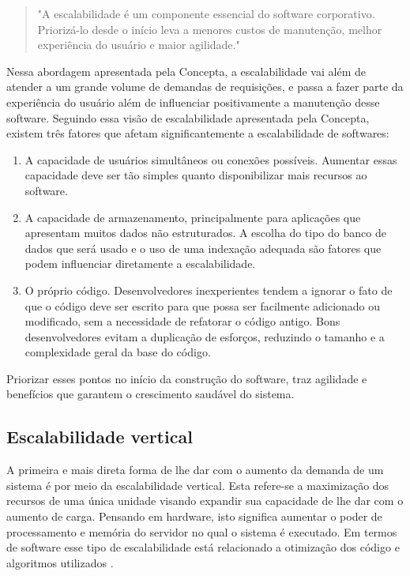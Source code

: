   \begin{quotation}
    "A escalabilidade é um componente essencial do software corporativo. Priorizá-lo
    desde o início leva a menores custos de manutenção, melhor experiência do usuário
    e maior agilidade."
  \end{quotation}

Nessa abordagem apresentada pela Concepta, a escalabilidade vai além de atender
a um grande volume de demandas de requisições, e passa a fazer parte da
experiência do usuário além de influenciar positivamente a manutenção desse
software. Seguindo essa visão de escalabilidade apresentada pela Concepta,
existem três fatores que afetam significantemente a escalabilidade de softwares:

  \begin{enumerate}
    \item A capacidade de usuários simultâneos ou conexões possíveis.
    Aumentar essas capacidade deve ser tão simples quanto disponibilizar mais
    recursos ao software.
    \item A capacidade de armazenamento, principalmente para aplicações
    que apresentam muitos dados não estruturados. A escolha do tipo do banco de
    dados que será usado e o uso de uma indexação adequada são fatores que
    podem influenciar diretamente a escalabilidade.
    \item O próprio código. Desenvolvedores inexperientes tendem a ignorar
    o fato de que o código deve ser escrito para que possa ser facilmente
    adicionado ou modificado, sem a necessidade de refatorar o código antigo.
    Bons desenvolvedores evitam a duplicação de esforços, reduzindo o tamanho
    e a complexidade geral da base do código.
  \end{enumerate}

Priorizar esses pontos no início da construção do software, traz agilidade e
benefícios que garantem o crescimento saudável do sistema.

\subsection{Escalabilidade vertical}

A primeira e mais direta forma de lhe dar com o aumento da demanda de um
sistema é por meio da escalabilidade vertical. Esta refere-se a maximização
dos recursos de uma única unidade visando expandir sua capacidade de lhe dar
com o aumento de carga.  Pensando em hardware, isto significa aumentar o poder
de processamento e memória do servidor no qual o sistema é executado. Em termos
de software esse tipo de escalabilidade está relacionado a otimização dos código
e algoritmos utilizados \cite{FreshGuide2012}.

